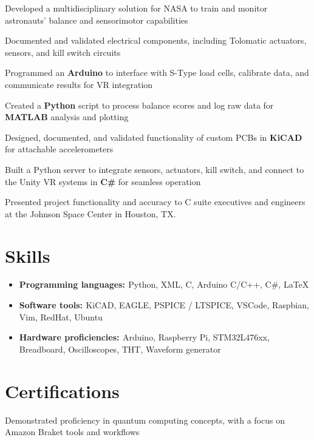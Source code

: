\documentclass[a4paper]{comcv}
\begin{document}
\vspace{5 mm}
    \begin{tightlist}
        \item Developed a multidisciplinary solution for NASA to train and monitor astronauts' balance and sensorimotor capabilities
        \item Documented and validated electrical components, including Tolomatic actuators, sensors, and kill switch circuits
        \item Programmed an {\bf{Arduino}} to interface with S-Type load cells, calibrate data, and communicate results for VR integration
        \item Created a {\bf{Python}} script to process balance scores and log raw data for {\bf{MATLAB}} analysis and plotting
        \item Designed, documented, and validated functionality of custom PCBs in {\bf{KiCAD}} for attachable accelerometers
        \item Built a Python server to integrate sensors, actuators, kill switch, and connect to the Unity VR systems in {\bf{C\#}} for seamless operation
        \item Presented project functionality and accuracy to C suite executives and engineers at the Johnson Space Center in Houston, TX. 

\end{tightlist}
\smallskip


\section{Skills}
\smallskip
\begin{itemize}
    \item {\bf{Programming languages: }}  {Python, XML, C, Arduino C/C++, C\#, LaTeX} 
    \item {\bf{Software tools: }} {KiCAD, EAGLE, PSPICE / LTSPICE, VSCode, Raspbian, Vim, RedHat, Ubuntu}
    \item {\bf{Hardware proficiencies: }}  {Arduino, Raspberry Pi, STM32L476xx, Breadboard, Oscilloscopes, THT, Waveform generator} 
\end{itemize}
\smallskip

\section{Certifications}
\smallskip

\smallskip
\begin{tightlist}
    \item Demonstrated proficiency in quantum computing concepts, with a focus on Amazon Braket tools and workflows
\end{tightlist}
\end{document}
